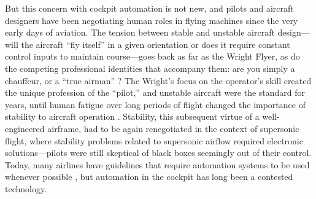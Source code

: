 
 But this concern with cockpit automation is not
new, and pilots and aircraft designers have been negotiating human
roles in flying machines since the very early days of aviation. The
tension between stable and unstable aircraft design---will the
aircraft ``fly itself'' in a given orientation or does it require
constant control inputs to maintain course---goes back as far as the
Wright Flyer, as do the competing professional identities that
accompany them: are you simply a chauffeur, or a ``true
airman'' \cite[p. 21]{DM}? The Wright's focus on the operator's
skill created the unique profession of the
``pilot,'' and unstable aircraft were the standard for years, until
human fatigue over long periods of flight changed the importance of
stability to aircraft operation \cite[p. 22-24]{DM}. Stability,
this subsequent virtue of a well-engineered airframe, had to be again
renegotiated in the context of supersonic flight, where stability
problems related to supersonic airflow required electronic
solutions---pilots were still skeptical of black boxes seemingly out
of their control. Today, 
many airlines 
have guidelines that require automation systems to be used
whenever possible \cite[p. 38]{PARCCAST}, but automation in the
cockpit has long been a contested technology. 


